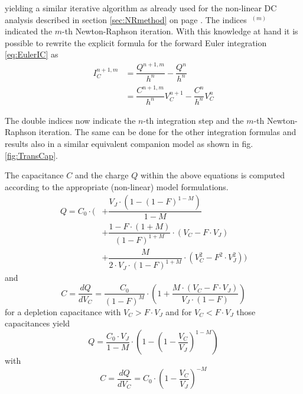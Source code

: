 yielding a similar iterative algorithm as already used for the
non-linear DC analysis described in section \ref{sec:NRmethod} on page
\pageref{sec:NRmethod}.  The indices $~^{(m)}$ indicated the $m$-th
Newton-Raphson iteration.  With this knowledge at hand it is possible
to rewrite the explicit formula for the forward Euler integration
\eqref{eq:EulerIC} as
\begin{equation}
\begin{split}
I_C^{n+1,m} &= \dfrac{Q^{n+1,m}}{h^{n}} - \dfrac{Q^{n}}{h^{n}}\\
&= \dfrac{C^{n+1,m}}{h^{n}} V_C^{n+1} - \dfrac{C^{n}}{h^{n}} V_C^{n}
\end{split}
\end{equation}

The double indices now indicate the $n$-th integration step and the
$m$-th Newton-Raphson iteration.  The same can be done for the other
integration formulas and results also in a similar equivalent
companion model as shown in fig. \ref{fig:TransCap}.

\addvspace{12pt}

The capacitance $C$ and the charge $Q$ within the above equations is
computed according to the appropriate (non-linear) model formulations.
\begin{equation}
\begin{split}
Q = C_0\cdot \Biggl(
& + \dfrac{V_J\cdot \left(1- \left(1 - F\right)^{1-M}\right)}{1-M}\\
& + \dfrac{1 - F\cdot\left(1 + M\right)}{\left(1-F\right)^{1+M}} \cdot \left(V_C - F\cdot V_J\right)\\
& + \dfrac{M}{2\cdot V_J \cdot \left(1-F\right)^{1+M}} \cdot\left(V_C^2 - F^2\cdot V_J^2\right) \Biggr)
\end{split}
\end{equation}
and
\begin{equation}
C = \dfrac{d Q}{d V_C} = \dfrac{C_0}{\left(1 - F\right)^M}\cdot \left(1 + \dfrac{M\cdot \left(V_C - F\cdot V_J\right)}{V_J\cdot \left(1 - F\right)}\right)
\end{equation}
for a depletion capacitance with $V_C > F\cdot V_J$ and for $V_C <
F\cdot V_J$ those capacitances yield
\begin{equation}
Q = \dfrac{C_0\cdot V_J}{1-M}\cdot\left(1-\left(1 - \dfrac{V_C}{V_J}\right)^{1-M}\right)
\end{equation}
with
\begin{equation}
C = \dfrac{d Q}{d V_C} = C_{0}\cdot \left(1 - \dfrac{V_{C}}{V_{J}}\right)^{-M}
\end{equation}

